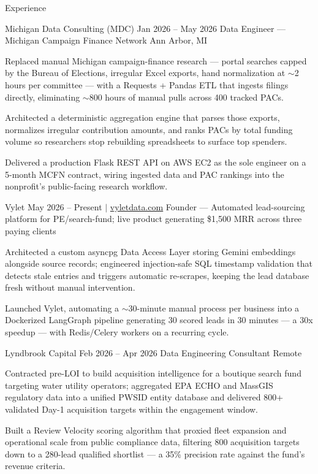 \documentclass[
	11pt
]{../../../template}
\begin{document}
	\begin{rSection}{E}{xperience}
		\begin{rSectionEntry}
			{Michigan Data Consulting (MDC)}
			{Jan 2026 -- May 2026}
			{Data Engineer --- Michigan Campaign Finance Network}
			{}
			{Ann Arbor, MI}

			\item Replaced manual Michigan campaign-finance research --- portal searches capped by the Bureau of Elections, irregular Excel exports, hand normalization at $\sim$2 hours per committee --- with a Requests + Pandas ETL that ingests filings directly, eliminating $\sim$800 hours of manual pulls across 400 tracked PACs.
			\item Architected a deterministic aggregation engine that parses those exports, normalizes irregular contribution amounts, and ranks PACs by total funding volume so researchers stop rebuilding spreadsheets to surface top spenders.
			\item Delivered a production Flask REST API on AWS EC2 as the sole engineer on a 5-month MCFN contract, wiring ingested data and PAC rankings into the nonprofit's public-facing research workflow.
		\end{rSectionEntry}

		\begin{rSectionEntry}
			{Vylet}
			{May 2026 -- Present $\vert$ \href{https://vyletdata.com}{vyletdata.com}}
			{Founder --- Automated lead-sourcing platform for PE/search-fund; live product generating \$1,500 MRR across three paying clients}
			{}
			{}

			\item Architected a custom asyncpg Data Access Layer storing Gemini embeddings alongside source records; engineered injection-safe SQL timestamp validation that detects stale entries and triggers automatic re-scrapes, keeping the lead database fresh without manual intervention.
			\item Launched Vylet, automating a $\sim$30-minute manual process per business into a Dockerized LangGraph pipeline generating 30 scored leads in 30 minutes --- a 30x speedup --- with Redis/Celery workers on a recurring cycle.
		\end{rSectionEntry}

		\begin{rSectionEntry}
			{Lyndbrook Capital}
			{Feb 2026 -- Apr 2026}
			{Data Engineering Consultant}
			{}
			{Remote}

			\item Contracted pre-LOI to build acquisition intelligence for a boutique search fund targeting water utility operators; aggregated EPA ECHO and MassGIS regulatory data into a unified PWSID entity database and delivered 800+ validated Day-1 acquisition targets within the engagement window.
			\item Built a Review Velocity scoring algorithm that proxied fleet expansion and operational scale from public compliance data, filtering 800 acquisition targets down to a 280-lead qualified shortlist --- a 35\% precision rate against the fund's revenue criteria.
		\end{rSectionEntry}


\end{rSection}
\end{document}
